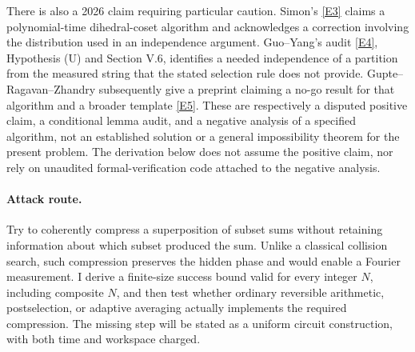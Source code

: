 \documentclass[11pt,a4paper]{article}
\newcommand{\eref}[2]{\hyperlink{extra:#1:#2}{[E#2]}}
\begin{document}
There is also a 2026 claim requiring particular caution. Simon's
\eref{216}{3} claims a polynomial-time dihedral-coset algorithm and
acknowledges a correction involving the distribution used in an
independence argument. Guo--Yang's audit \eref{216}{4}, Hypothesis (U) and
Section V.6, identifies a needed independence of a partition from the
measured string that the stated selection rule does not provide.
Gupte--Ragavan--Zhandry subsequently give a preprint claiming a no-go result
for that algorithm and a broader template \eref{216}{5}.
These are respectively a disputed positive claim, a conditional lemma
audit, and a negative analysis of a specified algorithm, not an established
solution or a general impossibility theorem for the present problem.
The derivation below does not assume the positive claim, nor rely on
unaudited formal-verification code attached to the negative analysis.

\paragraph{Attack route.}
Try to coherently compress a superposition of subset sums without
retaining information about which subset produced the sum. Unlike a
classical collision search, such compression preserves the hidden phase
and would enable a Fourier measurement. I derive a finite-size success
bound valid for every integer $N$, including composite $N$, and then test
whether ordinary reversible arithmetic, postselection, or adaptive
averaging actually implements the required compression. The missing step
will be stated as a uniform circuit construction, with both time and
workspace charged.
\end{document}
